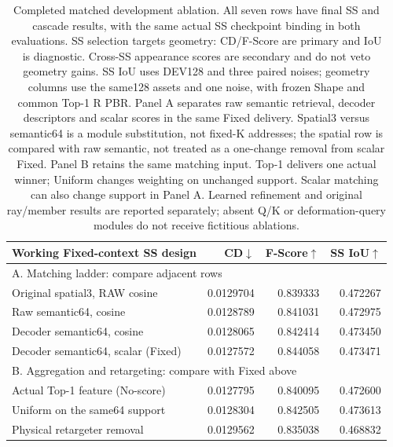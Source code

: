 \begin{table}[t]
\centering\small
\setlength{\tabcolsep}{4pt}
\begin{tabular}{lrrr}
\toprule
Working Fixed-context SS design&CD$\downarrow$&F-Score$\uparrow$&SS IoU$\uparrow$\\
\midrule
\multicolumn{4}{l}{A. Matching ladder: compare adjacent rows}\\
Original spatial3, RAW cosine&0.0129704&0.839333&0.472267\\
Raw semantic64, cosine&0.0128789&0.841031&0.472975\\
Decoder semantic64, cosine&0.0128065&0.842414&0.473450\\
Decoder semantic64, scalar (Fixed)&0.0127572&0.844058&0.473471\\
\midrule
\multicolumn{4}{l}{B. Aggregation and retargeting: compare with Fixed above}\\
Actual Top-1 feature (No-score)&0.0127795&0.840095&0.472600\\
Uniform on the same64 support&0.0128304&0.842505&0.473613\\
Physical retargeter removal&0.0129562&0.835038&0.468832\\
\bottomrule
\end{tabular}
\caption{Completed matched development ablation. All seven rows have final
SS and cascade results, with the same actual SS checkpoint binding in both evaluations.
SS selection targets geometry: CD/F-Score are primary and IoU is diagnostic.
Cross-SS appearance scores are secondary and do not veto geometry gains.
SS IoU uses DEV128 and three paired noises; geometry columns use the same128
assets and one noise, with frozen Shape and common Top-1 R PBR. Panel A
separates raw semantic retrieval, decoder descriptors and scalar scores in
the same Fixed delivery. Spatial3 versus semantic64 is a module substitution,
not fixed-K addresses; the spatial row is compared with raw semantic, not
treated as a one-change removal from scalar Fixed. Panel B retains the same
matching input. Top-1 delivers one actual winner; Uniform changes weighting
on unchanged support. Scalar matching can also change support in Panel A.
Learned refinement and original ray/member results are reported separately;
absent Q/K or deformation-query modules do not receive fictitious ablations.}
\label{tab:final-ablation-pending}
\end{table}
